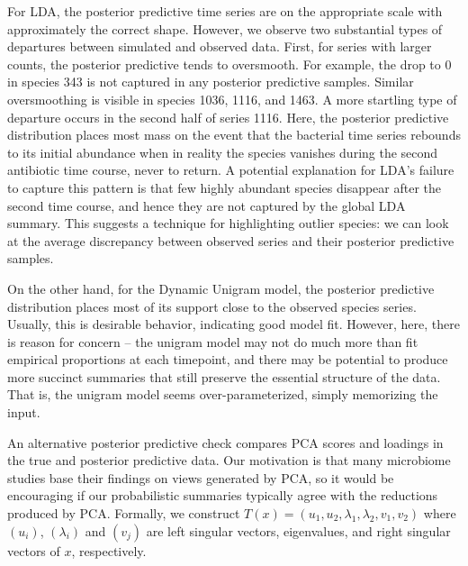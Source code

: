 \documentclass[oupdraft]{bio}
\begin{document}
For LDA, the posterior predictive time series are on the appropriate scale with
approximately the correct shape. However, we observe two substantial types of
departures between simulated and observed data. First, for series with larger
counts, the posterior predictive tends to oversmooth. For example, the drop to 0
in species 343 is not captured in any posterior predictive samples. Similar
oversmoothing is visible in species 1036, 1116, and 1463. A more startling type of
departure occurs in the second half of series 1116. Here, the posterior
predictive distribution places most mass on the event that the bacterial time
series rebounds to its initial abundance when in reality the species vanishes
during the second antibiotic time course, never to return. A potential
explanation for LDA's failure to capture this pattern is that few highly
abundant species disappear after the second time course, and hence they are not
captured by the global LDA summary. This suggests a technique for highlighting
outlier species: we can look at the average discrepancy between observed series
and their posterior predictive samples.

On the other hand, for the Dynamic Unigram model, the posterior predictive
distribution places most of its support close to the observed species series.
Usually, this is desirable behavior, indicating good model fit. However, here,
there is reason for concern -- the unigram model may not do much more than fit
empirical proportions at each timepoint, and there may be potential to produce
more succinct summaries that still preserve the essential structure of the data.
That is, the unigram model seems over-parameterized, simply memorizing the
input.

An alternative posterior predictive check compares PCA scores and loadings in
the true and posterior predictive data. Our motivation is that many microbiome
studies base their findings on views generated by PCA, so it would be
encouraging if our probabilistic summaries typically agree with the reductions
produced by PCA. Formally, we construct $T\left(x\right) = \left(u_{1}, u_{2},
\lambda_{1}, \lambda_{2}, v_{1}, v_{2}\right)$ where $\left(u_{i}\right)$,
$\left(\lambda_{i}\right)$ and $\left(v_{j}\right)$ are left singular vectors,
eigenvalues, and right singular vectors of $x$, respectively.
\end{document}
